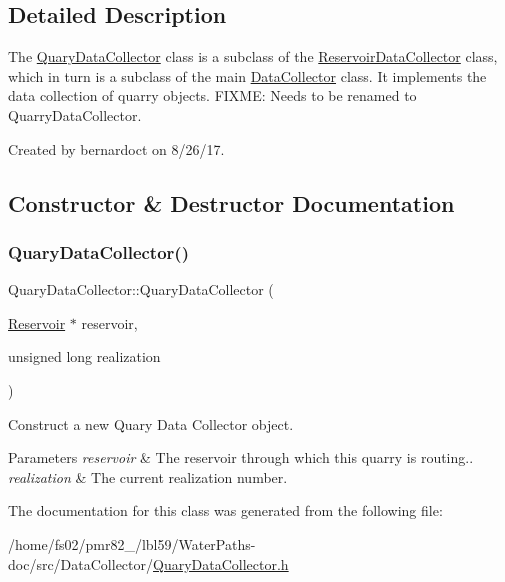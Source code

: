 \subsection{Detailed Description}
The {\ttfamily \mbox{\hyperlink{classQuaryDataCollector}{Quary\+Data\+Collector}}} class is a subclass of the {\ttfamily \mbox{\hyperlink{classReservoirDataCollector}{Reservoir\+Data\+Collector}}} class, which in turn is a subclass of the main {\ttfamily \mbox{\hyperlink{classDataCollector}{Data\+Collector}}} class. It implements the data collection of quarry objects. F\+I\+X\+ME\+: Needs to be renamed to {\ttfamily Quarry\+Data\+Collector}. 

Created by bernardoct on 8/26/17. 

\subsection{Constructor \& Destructor Documentation}
\mbox{\label{classQuaryDataCollector_af2f534feeca2a37104309a595d064cbd}} 
\subsubsection{\texorpdfstring{Quary\+Data\+Collector()}{QuaryDataCollector()}}
{\footnotesize\ttfamily Quary\+Data\+Collector\+::\+Quary\+Data\+Collector (\begin{DoxyParamCaption}\item[{\mbox{\hyperlink{classReservoir}{Reservoir}} $\ast$}]{reservoir,  }\item[{unsigned long}]{realization }\end{DoxyParamCaption})}



Construct a new Quary Data Collector object. 


\begin{DoxyParams}{Parameters}
{\em reservoir} & The reservoir through which this quarry is routing.. \\
\hline
{\em realization} & The current realization number. \\
\hline
\end{DoxyParams}


The documentation for this class was generated from the following file\+:\begin{DoxyCompactItemize}
\item 
/home/fs02/pmr82\+\_/lbl59/\+Water\+Paths-\/doc/src/\+Data\+Collector/\mbox{\hyperlink{QuaryDataCollector_8h}{Quary\+Data\+Collector.\+h}}\end{DoxyCompactItemize}
